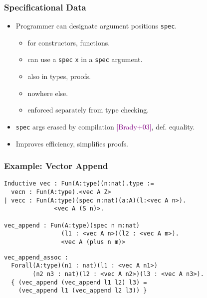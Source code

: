 \documentclass[11pt]{beamer}
\begin{document}
\begin{frame}
  \frametitle{Specificational Data}

\begin{itemize}

\item Programmer can designate argument positions \texttt{spec}.

\begin{itemize}
\item for constructors, functions.
\item can use a \texttt{spec} \texttt{x} in a \texttt{spec} argument.
\item also in types, proofs.
\item nowhere else.
\item enforced separately from type checking.
\end{itemize}

\item \texttt{spec} args erased by compilation \textcolor{purple}{[Brady+03]}, def. equality.

\item Improves efficiency, simplifies proofs.

\end{itemize}
\end{frame}

\begin{frame}[containsverbatim]
\frametitle{Example: Vector Append}
\footnotesize
\begin{verbatim}
Inductive vec : Fun(A:type)(n:nat).type :=
  vecn : Fun(A:type).<vec A Z>
| vecc : Fun(A:type)(spec n:nat)(a:A)(l:<vec A n>).
              <vec A (S n)>.

vec_append : Fun(A:type)(spec n m:nat)
                (l1 : <vec A n>)(l2 : <vec A m>).
                <vec A (plus n m)>
\end{verbatim}


\begin{verbatim}
vec_append_assoc : 
  Forall(A:type)(n1 : nat)(l1 : <vec A n1>)
        (n2 n3 : nat)(l2 : <vec A n2>)(l3 : <vec A n3>).
  { (vec_append (vec_append l1 l2) l3) =
    (vec_append l1 (vec_append l2 l3)) }

\end{verbatim}

\end{frame}
\end{document}
